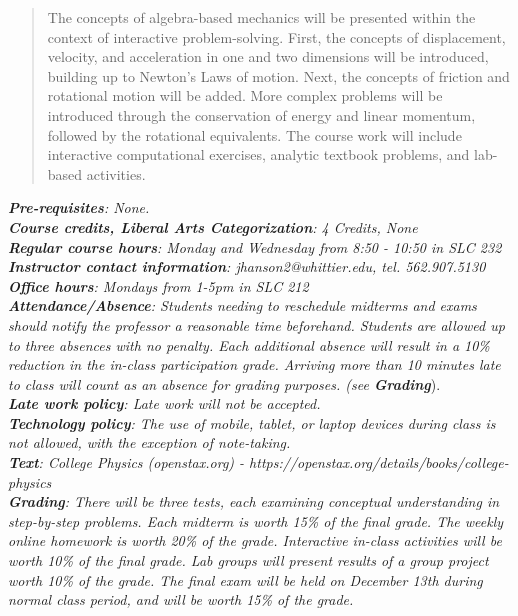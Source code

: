 \documentclass[10pt]{article}
\begin{document}
\maketitle

\begin{abstract}
The concepts of algebra-based mechanics will be presented within the context of interactive problem-solving.  First, the concepts of displacement, velocity, and acceleration in one and two dimensions will be introduced, building up to Newton's Laws of motion.  Next, the concepts of friction and rotational motion will be added.  More complex problems will be introduced through the conservation of energy and linear momentum, followed by the rotational equivalents.  The course work will include interactive computational exercises, analytic textbook problems, and lab-based activities.
\end{abstract}
\noindent
\textit{\textbf{Pre-requisites}: None.} \\
\textit{\textbf{Course credits, Liberal Arts Categorization}: 4 Credits, None} \\
\textit{\textbf{Regular course hours}: Monday and Wednesday from 8:50 - 10:50 in SLC 232} \\
\textit{\textbf{Instructor contact information}: jhanson2@whittier.edu, tel. 562.907.5130} \\
\textit{\textbf{Office hours}: Mondays from 1-5pm in SLC 212} \\
\textit{\textbf{Attendance/Absence}: Students needing to reschedule midterms and exams should notify the professor a reasonable time beforehand.  Students are allowed up to three absences with no penalty.  Each additional absence will result in a 10\% reduction in the in-class participation grade.  Arriving more than 10 minutes late to class will count as an absence for grading purposes. (see \textit{\textbf{Grading}}}). \\
\textit{\textbf{Late work policy}: Late work will not be accepted.} \\
\textit{\textbf{Technology policy}: The use of mobile, tablet, or laptop devices during class is not allowed, with the exception of note-taking.} \\
\textit{\textbf{Text}: College Physics (openstax.org) -  https://openstax.org/details/books/college-physics} \\
\textit{\textbf{Grading}: There will be three tests, each examining conceptual understanding in step-by-step problems.  Each midterm is worth 15\% of the final grade.  The weekly online homework is worth 20\% of the grade.  Interactive in-class activities will be worth 10\% of the final grade.  Lab groups will present results of a group project worth 10\% of the grade.  The final exam will be held on December 13th during normal class period, and will be worth 15\% of the grade.} \\
\end{document}
